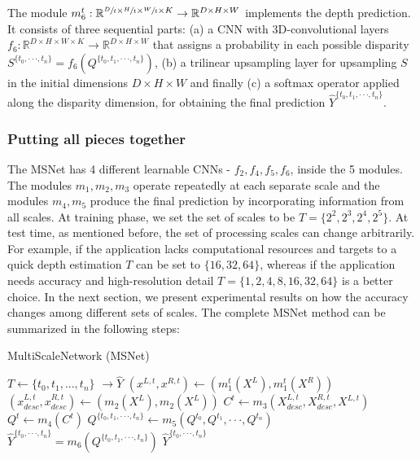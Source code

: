 \documentclass[runningheads]{llncs}
\begin{document}
The module $m_6^t: \mathbb{R}^{\sfrac{D}{t} \times \sfrac{H}{t} \times \sfrac{W}{t} \times K} \rightarrow \mathbb{R}^{D \times H \times W}$ implements the depth prediction. It consists of three sequential parts: (a) a CNN with 3D-convolutional layers $f_6: \mathbb{R}^{D \times H \times W \times K} \rightarrow \mathbb{R}^{D \times H \times W}$ that assigns a probability in each possible disparity $S^{\{ t_0, \cdot \cdot \cdot, t_n \}} = f_6(Q^{\{t_0, t_1, \cdot \cdot \cdot, t_n\}})$, (b) a trilinear upsampling layer for upsampling $S$ in the initial dimensions $D \times H \times W$ and finally (c) a softmax operator applied along the disparity dimension, for obtaining the final prediction $\hat{Y}^{\{t_0, t_1, \cdot \cdot \cdot, t_n\}}$.

\subsubsection{Putting all pieces together}

The MSNet has 4 different learnable CNNs - $f_2, f_4, f_5, f_6$, inside the 5 modules. The modules $m_1, m_2, m_3$ operate repeatedly at each separate scale and the modules $m_4, m_5$ produce the final prediction by incorporating information from all scales. At training phase, we set the set of scales to be $T = \{ 2^2, 2^3, 2^4, 2^5 \}$. At test time, as mentioned before, the set of processing scales can change arbitrarily. For example, if the application lacks computational resources and targets to a quick depth estimation $T$ can be set to $\{ 16, 32, 64\}$, whereas if the application needs accuracy and high-resolution detail $T = \{1, 2, 4, 8, 16, 32, 64 \}$ is a better choice. In the next section, we present experimental results on how the accuracy changes among different sets of scales. The complete MSNet method can be summarized in the following steps:


\begin{algorithm}
\caption{MultiScaleNetwork (MSNet)}\label{alg:MSNET}
\begin{algorithmic}[1]
\State $T \gets \{ t_0, t_1, ... , t_n\}$ 
 $\rightarrow \hat{Y}$ 
\State $(x^{L,t},  x^{R,t}) \gets (m_1^t(X^L),m_1^t(X^R)) $ 
\State $(x^{L,t}_{desc}, x^{R,t}_{desc}) \gets (m_2(X^L), m_2(X^L))$ 
\State $C^{t} \gets m_3(X^{L,t}_{desc}, X^{R,t}_{desc}, X^{L,t})$ 
\State $Q^{t} \gets m_4(C^{t})$ 
\EndFor
\State $Q^{\{t_0, t_1, \cdot \cdot \cdot, t_n\}} \gets m_5(Q^{t_0}, Q^{t_1}, \cdot \cdot \cdot, Q^{t_n})$ 
\State $\hat{Y}^{\{ t_0, \cdot \cdot \cdot, t_n \}} = m_6(Q^{\{t_0, t_1, \cdot \cdot \cdot, t_n\}}) $ 
\State \Return $\hat{Y}^{\{ t_0, \cdot \cdot \cdot, t_n \}} $
\EndProcedure
\end{algorithmic}
\end{algorithm}
\end{document}
